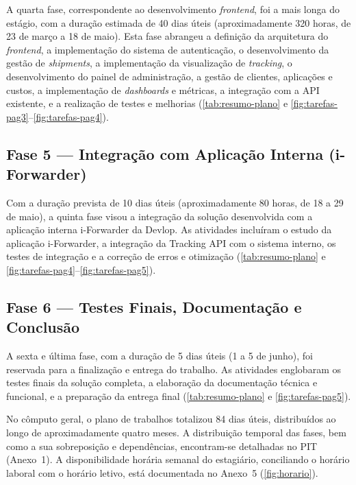 \documentclass[a4paper,12pt]{report}
\begin{document}
A quarta fase, correspondente ao desenvolvimento \textit{frontend}, foi a mais longa do estágio, com a duração estimada de 40 dias úteis (aproximadamente 320 horas, de 23 de março a 18 de maio). Esta fase abrangeu a definição da arquitetura do \textit{frontend}, a implementação do sistema de autenticação, o desenvolvimento da gestão de \textit{shipments}, a implementação da visualização de \textit{tracking}, o desenvolvimento do painel de administração, a gestão de clientes, aplicações e custos, a implementação de \textit{dashboards} e métricas, a integração com a API existente, e a realização de testes e melhorias (\autoref{tab:resumo-plano} e \autoref{fig:tarefas-pag3}--\autoref{fig:tarefas-pag4}).

\subsection{Fase 5 --- Integração com Aplicação Interna (i-Forwarder)}

Com a duração prevista de 10 dias úteis (aproximadamente 80 horas, de 18 a 29 de maio), a quinta fase visou a integração da solução desenvolvida com a aplicação interna i-Forwarder da Devlop. As atividades incluíram o estudo da aplicação i-Forwarder, a integração da Tracking API com o sistema interno, os testes de integração e a correção de erros e otimização (\autoref{tab:resumo-plano} e \autoref{fig:tarefas-pag4}--\autoref{fig:tarefas-pag5}).

\subsection{Fase 6 --- Testes Finais, Documentação e Conclusão}

A sexta e última fase, com a duração de 5 dias úteis (1 a 5 de junho), foi reservada para a finalização e entrega do trabalho. As atividades englobaram os testes finais da solução completa, a elaboração da documentação técnica e funcional, e a preparação da entrega final (\autoref{tab:resumo-plano} e \autoref{fig:tarefas-pag5}).

No cômputo geral, o plano de trabalhos totalizou 84 dias úteis, distribuídos ao longo de aproximadamente quatro meses. A distribuição temporal das fases, bem como a sua sobreposição e dependências, encontram-se detalhadas no PIT (Anexo~1). A disponibilidade horária semanal do estagiário, conciliando o horário laboral com o horário letivo, está documentada no Anexo~5 (\autoref{fig:horario}).

\end{document}

